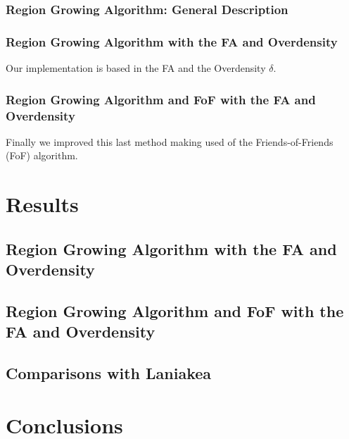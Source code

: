 \documentclass[12pt]{article}
\begin{document}
\subsubsection{Region Growing Algorithm: General Description}








\subsubsection{Region Growing Algorithm with the FA and Overdensity}
Our implementation is based in the FA and the Overdensity $\delta$.

\subsubsection{Region Growing Algorithm and FoF with the FA and Overdensity}
Finally we improved this last method making used of the Friends-of-Friends (FoF) algorithm.





\section{Results}


\subsection{Region Growing Algorithm with the FA and Overdensity}

\subsection{Region Growing Algorithm and FoF with the FA and Overdensity}

\subsection{Comparisons with Laniakea}

\section{Conclusions}
\end{document}
